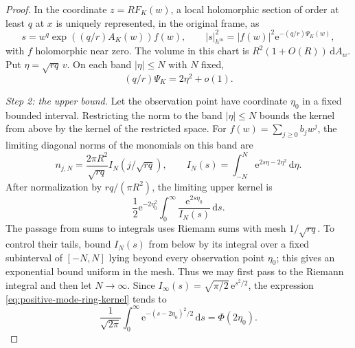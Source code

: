 \begin{proof}
In the coordinate $z=RF_K(w)$, a local holomorphic section of order at least $q$ at $x$ is uniquely represented, in the original frame, as
\begin{equation}\label{eq:quadrature-section-gauge}
 s=w^q\exp((q/r)A_K(w))f(w),\qquad
 |s|_{h^m}^2=|f(w)|^2\mathrm{e}^{-(q/r)\Psi_K(w)},
\end{equation}
with $f$ holomorphic near zero. The volume in this chart is $R^2(1+O(R))\,\mathrm{d}A_w$. Put
$\eta=\sqrt{rq}\,v$. On each band $|\eta|\leq N$ with $N$ fixed,
\[
 (q/r)\Psi_K=2\eta^2+o(1).
\]

\emph{Step 2: the upper bound.}
Let the observation point have coordinate $\eta_0$ in a fixed bounded interval. Restricting the norm to the band $|\eta|\leq N$ bounds the kernel from above by the kernel of the restricted space. For $f(w)=\sum_{j\geq0}b_jw^j$, the limiting diagonal norms of the monomials on this band are
\[
 n_{j,N}=\frac{2\pi R^2}{\sqrt{rq}}I_N(j/\sqrt{rq}),\qquad
 I_N(s)=\int_{-N}^N \mathrm{e}^{2s\eta-2\eta^2}\,\mathrm{d}\eta.
\]
After normalization by $rq/(\pi R^2)$, the limiting upper kernel is
\begin{equation}\label{eq:positive-mode-ring-kernel}
 \frac12\mathrm{e}^{-2\eta_0^2}\int_0^\infty\frac{\mathrm{e}^{2s\eta_0}}{I_N(s)}\,\mathrm{d}s.
\end{equation}
The passage from sums to integrals uses Riemann sums with mesh $1/\sqrt{rq}$. To control their tails, bound $I_N(s)$ from below by its integral over a fixed subinterval of $[-N,N]$ lying beyond every observation point $\eta_0$; this gives an exponential bound uniform in the mesh. Thus we may first pass to the Riemann integral and then let $N\to\infty$. Since
$I_\infty(s)=\sqrt{\pi/2}\,\mathrm{e}^{s^2/2}$, the expression \eqref{eq:positive-mode-ring-kernel} tends to
\begin{equation}\label{eq:gaussian-ring-limit}
 \frac1{\sqrt{2\pi}}\int_0^\infty \mathrm{e}^{-(s-2\eta_0)^2/2}\,\mathrm{d}s
 =\Phi(2\eta_0).
\end{equation}


\end{proof}
